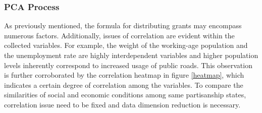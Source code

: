 
\subsubsection{PCA Process}
As previously mentioned, the formula for distributing grants may encompass numerous factors. Additionally, issues of correlation are evident within the collected variables. For example, the weight of the working-age population and the unemployment rate are highly interdependent variables and higher population levels inherently correspond to increased usage of public roads. This observation is further corroborated by the correlation heatmap in figure \ref{heatmap}, which indicates a certain degree of correlation among the variables. To compare the similarities of social and economic conditions among same partisanship states, correlation issue need to be fixed and data dimension reduction is necessary.%

